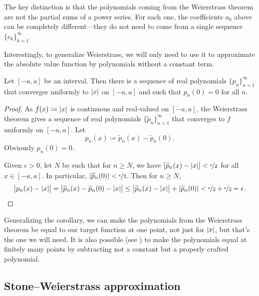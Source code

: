 The key distinction is that
the polynomials coming from the Weierstrass theorem are not the partial
sums of a power series.  For each one, the coefficients $a_k$ above can be
completely different---they do not need to come from a single sequence
$\{ c_k \}_{k=1}^\infty$.

\medskip

Interestingly, to generalize Weierstrass, we will only need to use it to
approximate the absolute value function by polynomials without
a constant term.

\begin{cor}
Let $[-a,a]$ be an interval.  Then there is a sequence of real polynomials
$\{ p_n \}_{n=1}^\infty$ that converges uniformly to $\lvert {x} \rvert$ on $[-a,a]$ and such that
$p_n(0) = 0$ for all $n$.
\end{cor}

\begin{proof}
As $f(x) \coloneqq \lvert {x} \rvert$ is continuous and real-valued
on $[-a,a]$, the Weierstrass theorem gives a sequence of
real polynomials $\{ \widetilde{p}_n \}_{n=1}^\infty$ that converges to $f$
uniformly on $[-a,a]$.
Let
\begin{equation*}
p_n(x) \coloneqq \widetilde{p}_n(x) - \widetilde{p}_n(0) .
\end{equation*}
Obviously $p_n(0) = 0$.

Given $\epsilon > 0$, let $N$ be such that
for $n \geq N$, we have
$\bigl\lvert\widetilde{p}_n(x)-\lvert {x} \rvert\big\rvert <
\nicefrac{\epsilon}{2}$ for all $x \in [-a,a]$.
In particular,
$\lvert {\widetilde{p}_n(0)} \rvert < \nicefrac{\epsilon}{2}$.
Then for $n \geq N$,
\begin{equation*}
\bigl\lvert p_n(x)-\lvert {x} \rvert \bigr\rvert
=
\bigl\lvert \widetilde{p}_n(x) - \widetilde{p}_n(0) - \lvert {x} \rvert \bigr\rvert
\leq
\bigl\lvert \widetilde{p}_n(x) - \lvert {x} \rvert \bigr\rvert + \lvert {\widetilde{p}_n(0)} \rvert < 
\nicefrac{\epsilon}{2} + \nicefrac{\epsilon}{2} = \epsilon . \qedhere
\end{equation*}
\end{proof}

Generalizing the corollary,
we can make the polynomials from the Weierstrass theorem
be equal to our target function at one point, not just for $\lvert {x} \rvert$, but
that's the one we will need.  It is also possible (see
)
to make the polynomials
equal at finitely many points by subtracting not a constant but a properly
crafted polynomial.

\subsection{Stone--Weierstrass approximation}

